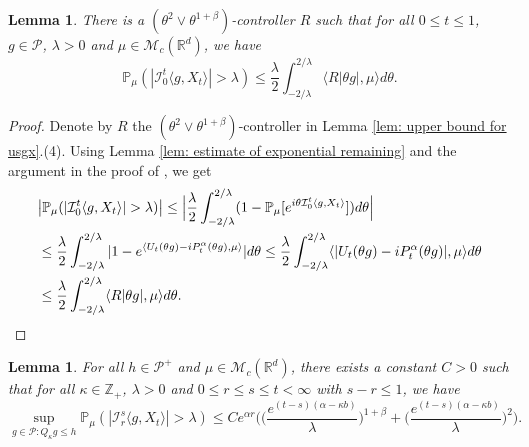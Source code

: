 \documentclass[12pt,a4paper]{amsart}
\theoremstyle{plain}
\newtheorem{lem}[thm]{Lemma}
\theoremstyle{definition}
\numberwithin{equation}{section}
\begin{document}
\begin{lem}
\label{lem: control pair for P(M>lambda)}
    There is a $(\theta^2\vee\theta^{1+\beta})$-controller $R$ such that for all $0\leq t\leq 1$, $g\in \mathcal P$, $\lambda >0$ and $\mu\in \mathcal M_c(\mathbb R^d)$, we have
\[
    \mathbb P_\mu ( |\mathcal{I}_0^t\langle g,X_t\rangle| > \lambda)
    \leq \frac{\lambda}{2}\int_{-2/\lambda}^{2/\lambda}\langle R|\theta g|,\mu\rangle d\theta.
\]
\end{lem}

\begin{proof}
    Denote by $R$ the $(\theta^2\vee\theta^{1+\beta})$-controller in Lemma \ref{lem: upper bound for usgx}.(4).
    Using Lemma \ref{lem: estimate of exponential remaining} and the argument in the proof of \cite[Theorem 3.3.6]{Durrett2010Probability}, we get
\begin{align}
    &\big|\mathbb P_\mu (|\mathcal{I}_0^t\langle g,X_t\rangle| > \lambda)\big|
    \leq \Big|\frac{\lambda}{2}\int_{-2/\lambda}^{2/\lambda}(1 - \mathbb P_\mu[e^{i\theta \mathcal{I}_0^t\langle g,X_t\rangle}])d\theta\Big|
    \\&\leq \frac{\lambda}{2}\int_{-2/\lambda}^{2/\lambda}|1-e^{\langle U_t(\theta g)-iP^\alpha_t (\theta g),\mu \rangle}|d\theta
    \leq \frac{\lambda}{2}\int_{-2/\lambda}^{2/\lambda}\langle |U_t(\theta g) - iP^\alpha_t(\theta g)|,\mu\rangle d\theta
    \\&\leq \frac{\lambda}{2}\int_{-2/\lambda}^{2/\lambda}\langle R|\theta g|,\mu\rangle d\theta.
      \qedhere
\end{align}
\end{proof}
\begin{lem}\label{lem: temp}
    For all $h \in \mathcal P^+$ and $\mu \in \mathcal M_c(\mathbb R^d)$, there exists a constant $C > 0$ such that
       for all $\kappa \in \mathbb Z_+ $, $\lambda > 0$ and $0\leq r\leq s\leq t<\infty$ with $s-r \leq 1$, we have
\[
    \sup_{g \in \mathcal P: Q_\kappa g\leq h}\mathbb P_{\mu}(|\mathcal I_r^s\langle g, X_t\rangle|>\lambda)
    \leq C e^{\alpha r} \bigg(\Big( \frac{e^{(t-s)(\alpha - \kappa b)}}{\lambda}\Big)^{1+\beta} + \Big( \frac{e^{(t-s)(\alpha - \kappa b)}}{\lambda}\Big)^{2} \bigg).
\]
\end{lem}
\end{document}
